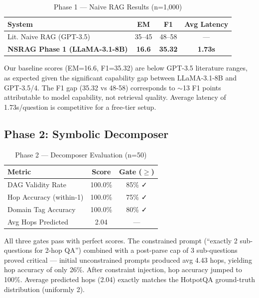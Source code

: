 \documentclass[conference]{IEEEtran}
\begin{document}
\begin{table}[h]
\centering
\caption{Phase 1 — Naive RAG Results (n=1,000)}
\label{tab:phase1}
\begin{tabular}{lccc}
\toprule
\textbf{System} & \textbf{EM} & \textbf{F1} & \textbf{Avg Latency} \\
\midrule
Lit. Naive RAG (GPT-3.5) & 35–45 & 48–58 & — \\
\textbf{NSRAG Phase 1 (LLaMA-3.1-8B)} & \textbf{16.6} & \textbf{35.32} & \textbf{1.73s} \\
\bottomrule
\end{tabular}
\end{table}

Our baseline scores (EM=16.6, F1=35.32) are below GPT-3.5 literature ranges, as expected given the significant capability gap between LLaMA-3.1-8B and GPT-3.5/4. The F1 gap (35.32 vs 48-58) corresponds to $\sim$13 F1 points attributable to model capability, not retrieval quality. Average latency of 1.73s/question is competitive for a free-tier setup.

\subsection{Phase 2: Symbolic Decomposer}

\begin{table}[h]
\centering
\caption{Phase 2 — Decomposer Evaluation (n=50)}
\label{tab:phase2}
\begin{tabular}{lcc}
\toprule
\textbf{Metric} & \textbf{Score} & \textbf{Gate ($\geq$)} \\
\midrule
DAG Validity Rate & 100.0\% & 85\% ✓ \\
Hop Accuracy (within-1) & 100.0\% & 75\% ✓ \\
Domain Tag Accuracy & 100.0\% & 80\% ✓ \\
Avg Hops Predicted & 2.04 & — \\
\bottomrule
\end{tabular}
\end{table}

All three gates pass with perfect scores. The constrained prompt (``exactly 2 sub-questions for 2-hop QA'') combined with a post-parse cap of 3 sub-questions proved critical — initial unconstrained prompts produced avg 4.43 hops, yielding hop accuracy of only 26\%. After constraint injection, hop accuracy jumped to 100\%. Average predicted hops (2.04) exactly matches the HotpotQA ground-truth distribution (uniformly 2).
\end{document}
